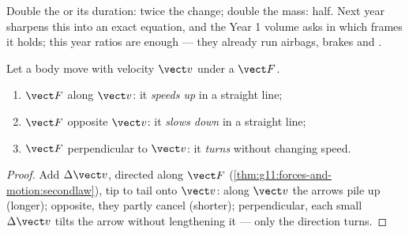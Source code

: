 \begin{remark}
Double the  or its duration: twice the change; double the mass:
half. Next year sharpens this into an exact equation, and the Year 1
volume asks in which frames it holds; this year ratios are enough ---
they already run airbags, brakes and .
\end{remark}

\begin{proposition}\label{prop:g11:forces-and-motion:cases}
Let a body move with velocity $\vect v$ under a  $\vect F$.
\begin{enumerate}
  \item $\vect F$ along $\vect v$: it \emph{speeds up} in a straight line;
  \item $\vect F$ opposite $\vect v$: it \emph{slows down} in a straight line;
  \item $\vect F$ perpendicular to $\vect v$: it \emph{turns} without
        changing speed.
\end{enumerate}
\end{proposition}

\begin{proof}
Add $\Delta\vect v$, directed along $\vect F$
(\cref{thm:g11:forces-and-motion:secondlaw}), tip to tail onto
$\vect v$: along $\vect v$ the arrows pile up (longer); opposite, they
partly cancel (shorter); perpendicular, each small $\Delta \vect v$
tilts the arrow without lengthening it --- only the direction turns.
\end{proof}

